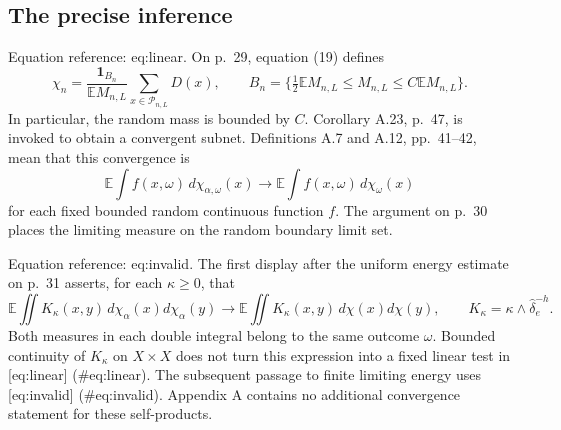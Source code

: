 \documentclass[10pt]{article}
\begin{document}
\subsection*{The precise inference}
Equation reference: eq:linear. On p. 29, equation (19) defines \[\chi_n=\frac{\mathbf1_{B_n}}{\mathbb EM_{n,L}}
              \sum_{x\in\mathcal P_{n,L}}D(x),
 \qquad
 B_n=\{\tfrac12\mathbb EM_{n,L}\leq M_{n,L}\leq C\mathbb EM_{n,L}\}.\] In particular, the random mass is bounded by \(C\). Corollary A.23, p. 47, is invoked to obtain a convergent subnet. Definitions A.7 and A.12, pp. 41–42, mean that this convergence is \[
 \mathbb E\int f(x,\omega)\,d\chi_{\alpha,\omega}(x)
 \longrightarrow
 \mathbb E\int f(x,\omega)\,d\chi_\omega(x)\] for each fixed bounded random continuous function \(f\). The argument on p. 30 places the limiting measure on the random boundary limit set.\par
Equation reference: eq:invalid. The first display after the uniform energy estimate on p. 31 asserts, for each \(\kappa\geq0\), that \[
 \mathbb E\iint K_\kappa(x,y)\,d\chi_\alpha(x)d\chi_\alpha(y)
 \longrightarrow
 \mathbb E\iint K_\kappa(x,y)\,d\chi(x)d\chi(y),
 \qquad K_\kappa=\kappa\wedge\widehat\delta_e^{-h}.\] Both measures in each double integral belong to the same outcome \(\omega\). Bounded continuity of \(K_\kappa\) on \(X\times X\) does not turn this expression into a fixed linear test in [eq:linear] (\#eq:linear). The subsequent passage to finite limiting energy uses [eq:invalid] (\#eq:invalid). Appendix A contains no additional convergence statement for these self-products.\par
\end{document}
